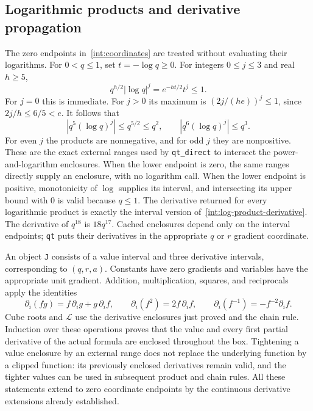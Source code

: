 \subsection{Logarithmic products and derivative propagation}
\label{int:derivatives}

The zero endpoints in~\eqref{int:coordinates} are treated without
evaluating their logarithms.  For $0<q\le1$, set $t=-\log q\ge0$.
For integers $0\le j\le3$ and real $h\ge5$,
\[
 q^{h/2}|\log q|^j=e^{-ht/2}t^j\le1.
\]
For $j=0$ this is immediate.  For $j>0$ its maximum is
$(2j/(he))^j\le1$, since $2j/h\le6/5<e$.
It follows that
\begin{equation}
 |q^5(\log q)^j|\le q^{5/2}\le q^2,\qquad
 |q^6(\log q)^j|\le q^3.
 \label{int:qt-bound}
\end{equation}
For even $j$ the products are nonnegative, and for odd $j$ they are
nonpositive.  These are the exact external ranges used by
\texttt{qt\_direct} to intersect the power-and-logarithm enclosures.
When the lower endpoint is zero, the same ranges directly supply
an enclosure, with no logarithm call.  When the lower endpoint is
positive, monotonicity of $\log$ supplies its interval, and intersecting
its upper bound with $0$ is valid because $q\le1$.  The derivative
returned for every logarithmic product is exactly the interval
version of~\eqref{int:log-product-derivative}.  The derivative of
$q^{18}$ is $18q^{17}$.  Cached enclosures depend only on the interval
endpoints; \texttt{qt} puts their derivatives in the appropriate
$q$ or $r$ gradient coordinate.

An object \texttt{J} consists of a value interval and three derivative
intervals, corresponding to $(q,r,a)$.  Constants have zero gradients
and variables have the appropriate unit gradient.  Addition,
multiplication, squares, and reciprocals apply the identities
\[
 \partial_i(fg)=f\,\partial_i g+g\,\partial_i f,\qquad
 \partial_i(f^2)=2f\,\partial_i f,\qquad
 \partial_i(f^{-1})=-f^{-2}\partial_i f.
\]
Cube roots and $\mathcal L$ use the derivative enclosures just proved
and the chain rule.  Induction over these operations proves that the
value and every first partial derivative of the actual formula are
enclosed throughout the box.  Tightening a value enclosure by an
external range does not replace the underlying function by a clipped
function: its previously enclosed derivatives remain valid, and
the tighter values can be used in subsequent product and chain rules.
All these statements extend to zero coordinate endpoints by the
continuous derivative extensions already established.


